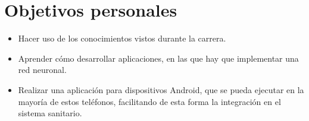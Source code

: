 \section{Objetivos personales}
\begin{itemize}
    \item Hacer uso de los conocimientos vistos durante la carrera.
    \item Aprender cómo desarrollar aplicaciones, en las que hay que implementar una red neuronal.
    \item Realizar una aplicación para dispositivos Android, que se pueda ejecutar en la mayoría de estos teléfonos, facilitando de esta forma la integración en el sistema sanitario.
    
\end{itemize}